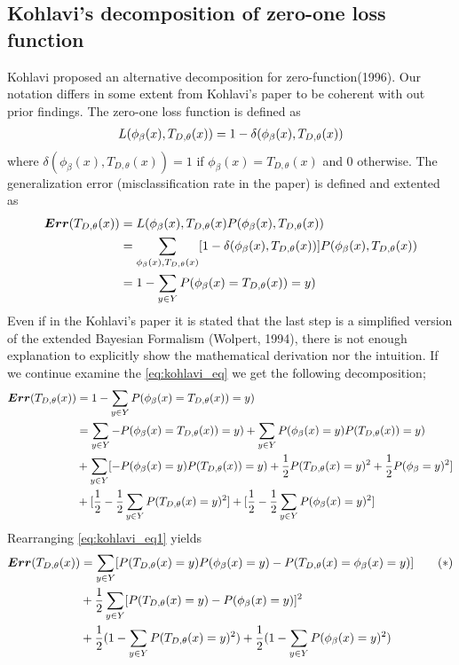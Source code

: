 \subsection{Kohlavi's decomposition of zero-one loss function}
Kohlavi proposed an alternative decomposition for zero-function(1996). Our notation differs in some extent from Kohlavi's paper to be coherent with out prior findings. The zero-one loss function is defined as
\begin{align}
L(\phi_{\beta}(x), T_{D,\theta}(x)) = 1 - \delta(\phi_{\beta}(x), T_{D, \theta}(x)) \notag
\end{align}
where $\delta(\phi_{\beta}(x), T_{D, \theta}(x)) = 1$ if $\phi_{\beta}(x) = T_{D, \theta}(x)$ and 0 otherwise. The generalization error (misclassification rate in the paper) is defined and extented as
\begin{align}\label{eq:kohlavi_eq}
\boldsymbol{Err}(T_{D, \theta}(x)) 
& = L(\phi_{\beta}(x), T_{D,\theta}(x) P(\phi_{\beta}(x), T_{D, \theta}(x)) \notag \\
& = \sum_{\phi_{\beta}(x), T_{D, \theta}(x)} [1 - \delta(\phi_{\beta}(x), T_{D, \theta}(x))] P(\phi_{\beta}(x), T_{D, \theta}(x)) \notag \\
& = 1 - \sum_{y \in Y} P(\phi_{\beta}(x) = T_{D, \theta}(x)) = y)
\end{align}
Even if in the Kohlavi's paper it is stated that the last step is a simplified version of the extended Bayesian Formalism (Wolpert, 1994), there is not enough explanation to explicitly show the mathematical derivation nor the intuition. If we continue examine the \autoref{eq:kohlavi_eq} we get the following decomposition;
\begin{align}\label{eq:kohlavi_eq1}
\boldsymbol{Err}(T_{D, \theta}(x))
& = 1 - \sum_{y \in Y} P(\phi_{\beta}(x) = T_{D, \theta}(x)) = y) \notag\\
& = \sum_{y \in Y} -P(\phi_{\beta}(x) = T_{D, \theta}(x)) = y) + \sum_{y \in Y} P(\phi_{\beta}(x) = y) P(T_{D, \theta}(x)) = y) \notag\\
& + \sum_{y \in Y}[-P(\phi_{\beta}(x) = y) P(T_{D, \theta}(x)) = y) + \dfrac{1}{2}P(T_{D, \theta}(x) = y)^2 + \dfrac{1}{2}P(\phi_{\beta} = y)^2] \notag\\
& + [\dfrac{1}{2} - \dfrac{1}{2}\sum_{y \in Y} P(T_{D,\theta}(x)= y)^2] + [\dfrac{1}{2} - \dfrac{1}{2}\sum_{y \in Y} P(\phi_{\beta}(x)= y)^2]
\end{align}
Rearranging \autoref{eq:kohlavi_eq1} yields
\begin{align}\label{eq:kohlavi_eq2}
\boldsymbol{Err}(T_{D, \theta}(x))
& = \sum_{y \in Y} [P(T_{D,\theta}(x)=y)P(\phi_{\beta}(x) = y) - P(T_{D,\theta}(x) = \phi_{\beta}(x) = y)]\tag{$*$} \\
& + \dfrac{1}{2}\sum_{y \in Y} [P(T_{D,\theta}(x)=y) - P(\phi_{\beta}(x) = y)]^2\notag \\
& + \dfrac{1}{2}(1 - \sum_{y \in Y}P(T_{D, \theta}(x) = y)^2) + \dfrac{1}{2}(1 - \sum_{y \in Y}P(\phi_{\beta}(x) = y)^2)\notag \\
\end{align}
